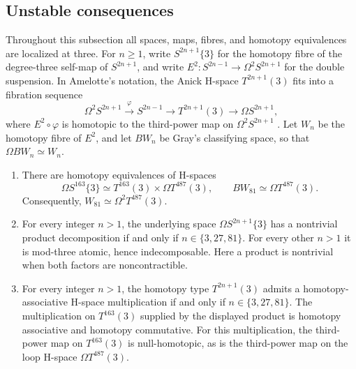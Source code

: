 \subsection{Unstable consequences}

Throughout this subsection all spaces, maps, fibres, and homotopy
equivalences are localized at three. For \(n\geq1\), write
\(S^{2n+1}\{3\}\) for the homotopy fibre of the degree-three self-map of
\(S^{2n+1}\), and write
\(E^2:S^{2n-1}\to\Omega^2S^{2n+1}\) for the double suspension.
In Amelotte's notation, the Anick H-space \(T^{2n+1}(3)\) fits into a
fibration sequence
\[
 \Omega^2S^{2n+1}\xrightarrow{\varphi}S^{2n-1}
 \longrightarrow T^{2n+1}(3)\longrightarrow\Omega S^{2n+1},
\]
where \(E^2\circ\varphi\) is homotopic to the third-power map on
\(\Omega^2S^{2n+1}\) \cite[Section~1]{Amelotte}.
Let \(W_n\) be the homotopy fibre of \(E^2\), and let \(BW_n\) be
Gray's classifying space, so that \(\Omega BW_n\simeq W_n\).

\begin{corollary}\label{intro:unstable-consequences}
\begin{enumerate}[label=\textup{(\roman*)}]
\item There are homotopy equivalences of H-spaces
\[
 \Omega S^{163}\{3\}\simeq T^{163}(3)\times\Omega T^{487}(3),
 \qquad BW_{81}\simeq\Omega T^{487}(3).
\]
Consequently, $W_{81}\simeq\Omega^2T^{487}(3)$.
\item For every integer $n>1$, the underlying space $\Omega S^{2n+1}\{3\}$ has a nontrivial product decomposition if and only if $n\in\{3,27,81\}$. For every other $n>1$ it is mod-three atomic, hence indecomposable. Here a product is nontrivial when both factors are noncontractible.
\item For every integer $n>1$, the homotopy type $T^{2n+1}(3)$ admits a homotopy-associative H-space multiplication if and only if $n\in\{3,27,81\}$. The multiplication on $T^{163}(3)$ supplied by the displayed product is homotopy associative and homotopy commutative. For this multiplication, the third-power map on $T^{163}(3)$ is null-homotopic, as is the third-power map on the loop H-space $\Omega T^{487}(3)$.
\end{enumerate}
\end{corollary}

